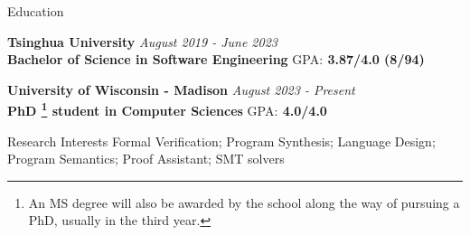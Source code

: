 \documentclass{resume} %
\newcommand{\Jun}{June }
\newcommand{\Aug}{August }
\begin{document}

\begin{rSection}{Education}


{\bf Tsinghua University} \hfill {\em \Aug 2019 - \Jun 2023} 
\\{\bf Bachelor of Science in Software Engineering} \hfill{GPA:\bf{ 3.87/4.0} (8/94)}

{\bf University of Wisconsin - Madison} \hfill {\em \Aug 2023 - Present} 
  \\{\bf PhD \footnote{An MS degree will also be awarded by the school along the way of pursuing a PhD, usually in the third year.} student in Computer Sciences} \hfill{GPA:\bf{ 4.0/4.0}}



\end{rSection}

\begin{rSection}{Research Interests}
Formal Verification; Program Synthesis; Language Design; Program Semantics; Proof Assistant; SMT solvers

\end{rSection}



    
\end{document}
